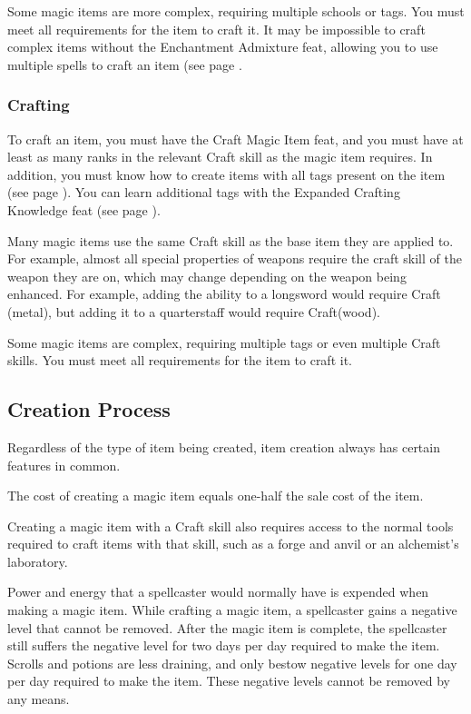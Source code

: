     Some magic items are more complex, requiring multiple schools or tags. You must meet all requirements for the item to craft it. It may be impossible to craft complex items without the Enchantment Admixture feat, allowing you to use multiple spells to craft an item (see page .

\subsubsection{Crafting}
    To craft an item, you must have the Craft Magic Item feat, and you must have at least as many ranks in the relevant Craft skill as the magic item requires.
    In addition, you must know how to create items with all tags present on the item (see page ).
    You can learn additional tags with the Expanded Crafting Knowledge feat (see page ).

    Many magic items use the same Craft skill as the base item they are applied to. For example, almost all special properties of weapons require the craft skill of the weapon they are on, which may change depending on the weapon being enhanced. For example, adding the  ability to a longsword would require Craft (metal), but adding it to a quarterstaff would require Craft(wood).

    Some magic items are complex, requiring multiple tags or even multiple Craft skills. You must meet all requirements for the item to craft it.

\subsection{Creation Process}
Regardless of the type of item being created, item creation always has certain features in common.

 The cost of creating a magic item equals one-half the sale cost of the item.

Creating a magic item with a Craft skill also requires access to the normal tools required to craft items with that skill, such as a forge and anvil or an alchemist's laboratory.

 Power and energy that a spellcaster would normally have is expended when making a magic item. While crafting a magic item, a spellcaster gains a negative level that cannot be removed. After the magic item is complete, the spellcaster still suffers the negative level for two days per day required to make the item. Scrolls and potions are less draining, and only bestow negative levels for one day per day required to make the item. These negative levels cannot be removed by any means.

